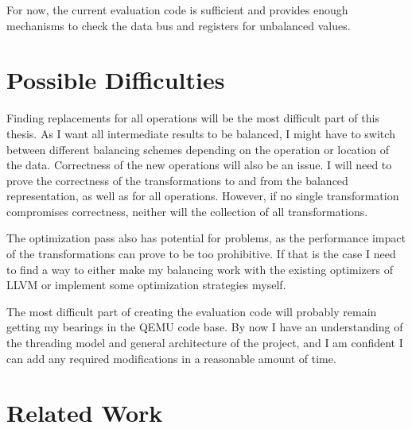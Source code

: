 \documentclass{article}
\newcommand{\qemu}{QEMU}
\newcommand{\llvm}{LLVM}
\begin{document}
For now, the current evaluation code is sufficient and provides enough mechanisms to check the data bus and registers for unbalanced values.

\section{Possible Difficulties}
\label{sec:difficulties}
Finding replacements for all operations will be the most difficult part of this thesis.
As I want all intermediate results to be balanced, I might have to switch between different balancing schemes depending on the operation or location of the data.
Correctness of the new operations will also be an issue.
I will need to prove the correctness of the transformations to and from the balanced representation, as well as for all operations.
However, if no single transformation compromises correctness, neither will the collection of all transformations.

The optimization pass also has potential for problems, as the performance impact of the transformations can prove to be too prohibitive.
If that is the case I need to find a way to either make my balancing work with the existing optimizers of \llvm{} or implement some optimization strategies myself.

The most difficult part of creating the evaluation code will probably remain getting my bearings in the \qemu{} code base.
By now I have an understanding of the threading model and general architecture of the project, and I am confident I can add any required modifications in a reasonable amount of time.

\section{Related Work}
\label{sec:related-work}





\end{document}
